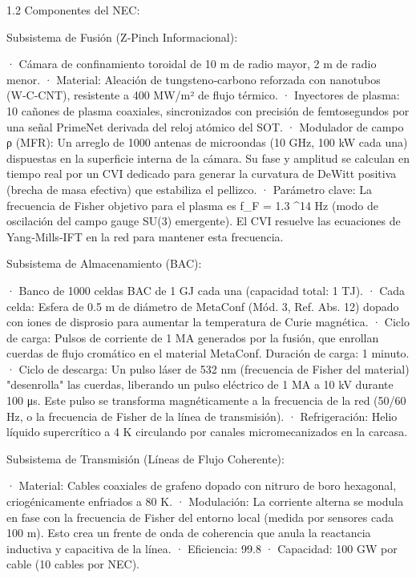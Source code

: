 \documentclass[12pt,a4paper]{book}
\begin{document}
1.2 Componentes del NEC:

Subsistema de Fusión (Z‑Pinch Informacional):

· Cámara de confinamiento toroidal de 10 m de radio mayor, 2 m de radio menor.
· Material: Aleación de tungsteno‑carbono reforzada con nanotubos (W‑C‑CNT), resistente a 400 MW/m² de flujo térmico.
· Inyectores de plasma: 10 cañones de plasma coaxiales, sincronizados con precisión de femtosegundos por una señal PrimeNet derivada del reloj atómico del SOT.
· Modulador de campo ρ (MFR): Un arreglo de 1000 antenas de microondas (10 GHz, 100 kW cada una) dispuestas en la superficie interna de la cámara. Su fase y amplitud se calculan en tiempo real por un CVI dedicado para generar la curvatura de DeWitt positiva (brecha de masa efectiva) que estabiliza el pellizco.
· Parámetro clave: La frecuencia de Fisher objetivo para el plasma es  f_F = 1.3 ^{14}  Hz (modo de oscilación del campo gauge SU(3) emergente). El CVI resuelve las ecuaciones de Yang‑Mills‑IFT en la red para mantener esta frecuencia.

Subsistema de Almacenamiento (BAC):

· Banco de 1000 celdas BAC de 1 GJ cada una (capacidad total: 1 TJ).
· Cada celda: Esfera de 0.5 m de diámetro de MetaConf (Mód. 3, Ref. Abs. 12) dopado con iones de disprosio para aumentar la temperatura de Curie magnética.
· Ciclo de carga: Pulsos de corriente de 1 MA generados por la fusión, que enrollan cuerdas de flujo cromático en el material MetaConf. Duración de carga: 1 minuto.
· Ciclo de descarga: Un pulso láser de 532 nm (frecuencia de Fisher del material) "desenrolla" las cuerdas, liberando un pulso eléctrico de 1 MA a 10 kV durante 100 μs. Este pulso se transforma magnéticamente a la frecuencia de la red (50/60 Hz, o la frecuencia de Fisher de la línea de transmisión).
· Refrigeración: Helio líquido supercrítico a 4 K circulando por canales micromecanizados en la carcasa.

Subsistema de Transmisión (Líneas de Flujo Coherente):

· Material: Cables coaxiales de grafeno dopado con nitruro de boro hexagonal, criogénicamente enfriados a 80 K.
· Modulación: La corriente alterna se modula en fase con la frecuencia de Fisher del entorno local (medida por sensores cada 100 m). Esto crea un frente de onda de coherencia que anula la reactancia inductiva y capacitiva de la línea.
· Eficiencia: 99.8%
· Capacidad: 100 GW por cable (10 cables por NEC).
\end{document}
